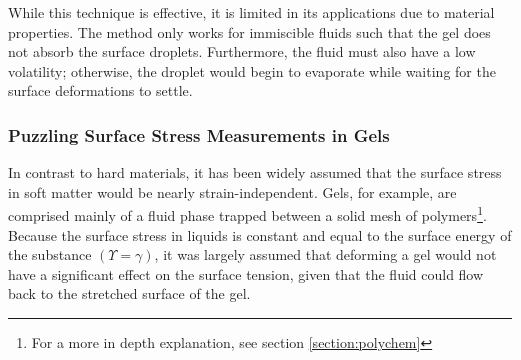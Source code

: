 While this technique is effective, it is limited in its applications due to material properties. The method only works for immiscible fluids such that the gel does not absorb the surface droplets. Furthermore, the fluid must also have a low volatility; otherwise, the droplet would begin to evaporate while waiting for the surface deformations to settle.

\subsubsection{Puzzling Surface Stress Measurements in Gels}
In contrast to hard materials, it has been widely assumed that the surface stress in soft matter would be nearly strain-independent. Gels, for example, are comprised mainly of a fluid phase trapped between a solid mesh of polymers\footnote{For a more in depth explanation, see section \ref{section:polychem}}. Because the surface stress in liquids is constant and equal to the surface energy of the substance $(\Upsilon = \gamma)$, it was largely assumed that deforming a gel would not have a significant effect on the surface tension, given that the fluid could flow back to the stretched surface of the gel. 


